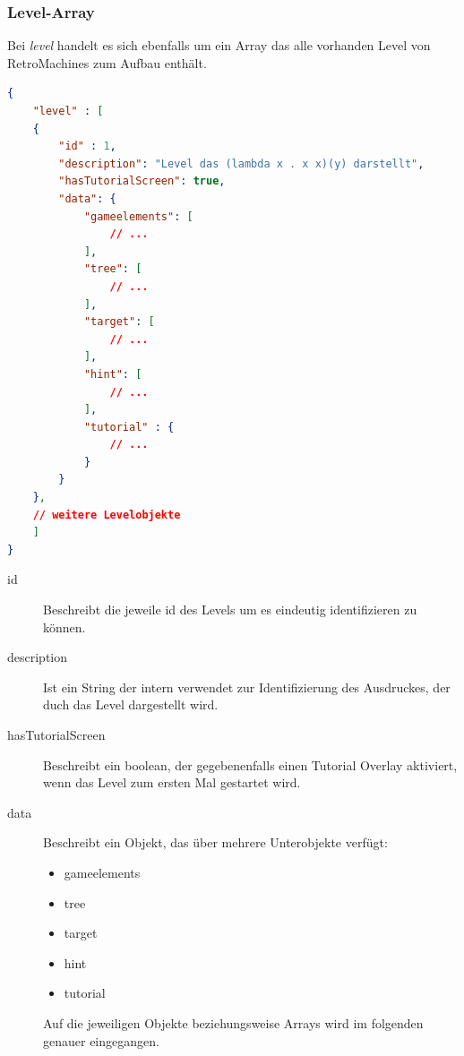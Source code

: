 \documentclass[11pt,a4paper]{report}
\begin{document}
\begin{minipage}{1\textwidth}

\subsubsection{Level-Array}

Bei \textit{level} handelt es sich ebenfalls um ein Array das alle vorhanden Level von RetroMachines zum Aufbau enthält.

\begin{lstlisting}[language=json, firstnumber=1]
{
    "level" : [
    {
        "id" : 1,
        "description": "Level das (lambda x . x x)(y) darstellt",
        "hasTutorialScreen": true,
        "data": {
            "gameelements": [
                // ...
            ],
            "tree": [
                // ...
            ],
            "target": [
                // ...
            ],
            "hint": [
                // ...
            ],
            "tutorial" : {
            	// ...
            }
        }
    },
    // weitere Levelobjekte
    ]
}
\end{lstlisting}

\begin{description}
	\item[id] Beschreibt die jeweile id des Levels um es eindeutig identifizieren zu können.
	\item[description] Ist ein String der intern verwendet zur Identifizierung des Ausdruckes, der duch das Level dargestellt wird.
	\item[hasTutorialScreen] Beschreibt ein boolean, der gegebenenfalls einen Tutorial Overlay aktiviert, wenn das Level zum ersten Mal gestartet wird.
	\item[data] Beschreibt ein Objekt, das über mehrere Unterobjekte verfügt:
		\begin{itemize} 
			\item gameelements 
			\item tree
			\item target
			\item hint
			\item tutorial
		\end{itemize}
	Auf die jeweiligen Objekte beziehungsweise Arrays wird im folgenden genauer eingegangen.
\end{description}

\end{minipage}
\end{document}
